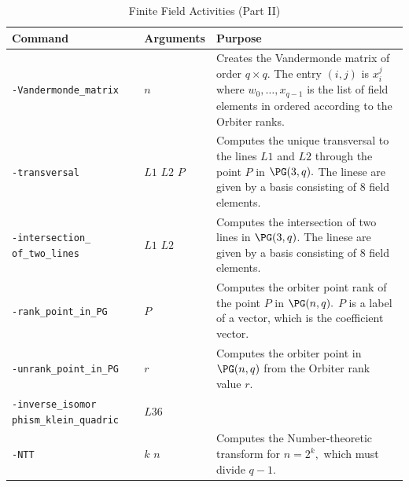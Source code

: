 \begin{table}
	\begin{center}
	\begin{tabular}{|p{4cm}|p{3cm}|p{7cm}|}
		\hline
		Command & Arguments & Purpose \\
		\hline
		\hline
		\verb'-Vandermonde_matrix' & $n$  &  Creates the Vandermonde matrix of order $q \times q$. 
		The entry $(i,j)$ is $x_i^j$ where $w_0,\ldots,x_{q-1}$ is the list of field 
		elements in ordered according to the  Orbiter ranks.\\
		\hline
		\verb'-transversal' &  $L1$ $L2$ $P$ & 
		Computes the unique transversal to the lines $L1$ and $L2$ through the point $P$ in $\PG(3,q).$ 
		The linese are given by a basis consisting of $8$ field elements.  \\
		\hline
		\verb'-intersection_' \verb'of_two_lines' &  $L1$ $L2$ &  
		Computes the intersection of two lines in $\PG(3,q)$. 
		The linese are given by a basis consisting of $8$ field elements.  \\
		\hline
		\verb'-rank_point_in_PG' &  $P$ &  
		Computes the orbiter point rank of the point $P$ in $\PG(n,q).$ 
		$P$ is a label of a vector, which is the coefficient vector.  \\
		\hline
		\verb'-unrank_point_in_PG' &  $r$ &  
		Computes the orbiter point in $\PG(n,q)$ from the Orbiter rank value $r$.  \\
		\hline
		\verb'-inverse_isomor' \verb'phism_klein_quadric' & $L36$  &    \\
		\hline
		\verb'-NTT' &  $k$ $n$ &  Computes the Number-theoretic transform for $n=2^k,$ which must divide $q-1$. \\
		\hline
		\end{tabular}
	\end{center}
	\caption{\label{tab:finite:field:activities:B}Finite Field Activities (Part II)}
\end{table}

